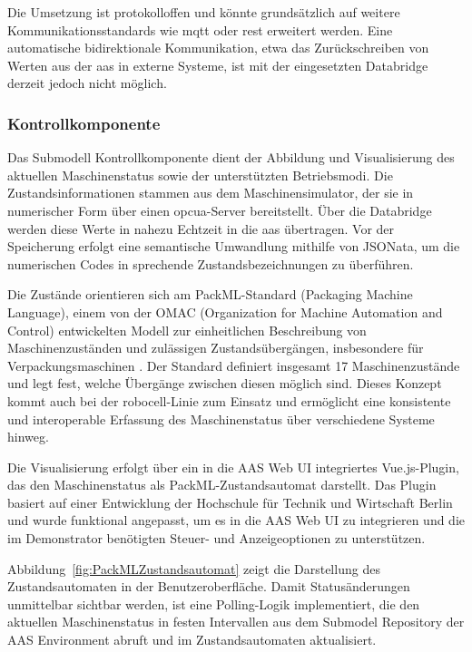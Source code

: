 Die Umsetzung ist protokolloffen und könnte grundsätzlich auf weitere Kommunikationsstandards wie \acs{mqtt} oder \acs{rest} erweitert werden.
Eine automatische bidirektionale Kommunikation, etwa das Zurückschreiben von Werten aus der \acs{aas} in externe Systeme, ist mit der eingesetzten Databridge derzeit jedoch nicht möglich.

\subsubsection*{Kontrollkomponente}
Das Submodell Kontrollkomponente dient der Abbildung und Visualisierung des aktuellen Maschinenstatus sowie der unterstützten Betriebsmodi.
Die Zustandsinformationen stammen aus dem Maschinensimulator, der sie in numerischer Form über einen \acs{opcua}-Server bereitstellt.
Über die Databridge werden diese Werte in nahezu Echtzeit in die \acs{aas} übertragen.
Vor der Speicherung erfolgt eine semantische Umwandlung mithilfe von JSONata, um die numerischen Codes in sprechende Zustandsbezeichnungen zu überführen.

Die Zustände orientieren sich am PackML-Standard (Packaging Machine Language), einem von der OMAC (Organization for Machine Automation and Control) entwickelten Modell zur einheitlichen Beschreibung von Maschinenzuständen und zulässigen Zustandsübergängen, insbesondere für Verpackungsmaschinen \cite{OMAC}. 
Der Standard definiert insgesamt 17 Maschinenzustände und legt fest, welche Übergänge zwischen diesen möglich sind. 
Dieses Konzept kommt auch bei der robocell-Linie zum Einsatz und ermöglicht eine konsistente und interoperable Erfassung des Maschinenstatus über verschiedene Systeme hinweg.

Die Visualisierung erfolgt über ein in die AAS Web UI integriertes Vue.js-Plugin, das den Maschinenstatus als PackML-Zustandsautomat darstellt.
Das Plugin basiert auf einer Entwicklung der Hochschule für Technik und Wirtschaft Berlin \cite{HTW1, HTW2} und wurde funktional angepasst, um es in die AAS Web UI zu integrieren und die im Demonstrator benötigten Steuer- und Anzeigeoptionen zu unterstützen.

Abbildung~\ref{fig:PackMLZustandsautomat} zeigt die Darstellung des Zustandsautomaten in der Benutzeroberfläche.
Damit Statusänderungen unmittelbar sichtbar werden, ist eine Polling-Logik implementiert, die den aktuellen Maschinenstatus in festen Intervallen aus dem Submodel Repository der AAS Environment abruft und im Zustandsautomaten aktualisiert.

